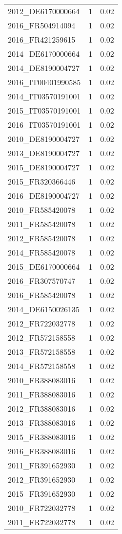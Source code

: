 \begin{table*}[htbp]
\begin{tabular}{lrr}
2012_DE6170000664 & 1 & 0.02 \\
2016_FR504914094 & 1 & 0.02 \\
2016_FR421259615 & 1 & 0.02 \\
2014_DE6170000664 & 1 & 0.02 \\
2014_DE8190004727 & 1 & 0.02 \\
2016_IT00401990585 & 1 & 0.02 \\
2014_IT03570191001 & 1 & 0.02 \\
2015_IT03570191001 & 1 & 0.02 \\
2016_IT03570191001 & 1 & 0.02 \\
2010_DE8190004727 & 1 & 0.02 \\
2013_DE8190004727 & 1 & 0.02 \\
2015_DE8190004727 & 1 & 0.02 \\
2015_FR320366446 & 1 & 0.02 \\
2016_DE8190004727 & 1 & 0.02 \\
2010_FR585420078 & 1 & 0.02 \\
2011_FR585420078 & 1 & 0.02 \\
2012_FR585420078 & 1 & 0.02 \\
2014_FR585420078 & 1 & 0.02 \\
2015_DE6170000664 & 1 & 0.02 \\
2016_FR307570747 & 1 & 0.02 \\
2016_FR585420078 & 1 & 0.02 \\
2014_DE6150026135 & 1 & 0.02 \\
2012_FR722032778 & 1 & 0.02 \\
2012_FR572158558 & 1 & 0.02 \\
2013_FR572158558 & 1 & 0.02 \\
2014_FR572158558 & 1 & 0.02 \\
2010_FR388083016 & 1 & 0.02 \\
2011_FR388083016 & 1 & 0.02 \\
2012_FR388083016 & 1 & 0.02 \\
2013_FR388083016 & 1 & 0.02 \\
2015_FR388083016 & 1 & 0.02 \\
2016_FR388083016 & 1 & 0.02 \\
2011_FR391652930 & 1 & 0.02 \\
2012_FR391652930 & 1 & 0.02 \\
2015_FR391652930 & 1 & 0.02 \\
2010_FR722032778 & 1 & 0.02 \\
2011_FR722032778 & 1 & 0.02 \\

\end{tabular}
\end{table*}
